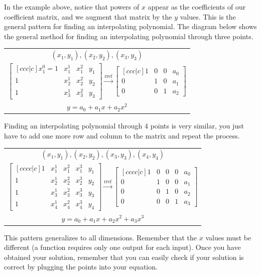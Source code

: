 In the example above, notice that powers of $x$ appear as the coefficients of our coefficient matrix, and we augment that matrix by the $y$ values. This is the general pattern for finding an interpolating polynomial. The diagram below shows the general method for finding an interpolating polynomial through three points.
\begin{center}
\begin{tabular}{c}
$(x_1,y_1),(x_2,y_2),(x_3,y_3)$ \\
 $
\begin{bmatrix}[ccc|c] 
x_1^0=1&x_1^1&x_1^2&y_1\\
1&x_2^1&x_2^2&y_2\\
1&x_3^1&x_3^2&y_3
\end {bmatrix}
\xrightarrow{\text{rref}}
\begin{bmatrix}[ccc|c]
1&0&0&a_0\\
0&1&0&a_1\\
0&0&1&a_2
\end {bmatrix} 
$
\\
 $y=a_0+a_1x+a_2x^2$
\end{tabular}
\end{center}
Finding an interpolating polynomial through 4 points is very similar, you just have to add one more row and column to the matrix and repeat the process.
\begin{center}
\begin{tabular}{c}
$(x_1,y_1),(x_2,y_2),(x_3,y_3),(x_4,y_4)$\\
$
\begin{bmatrix}[cccc|c] 
1&x_1^1&x_1^2&x_1^3&y_1\\
1&x_2^1&x_2^2&x_2^3&y_2\\
1&x_3^1&x_3^2&x_3^3&y_3\\
1&x_4^1&x_4^2&x_4^3&y_4
\end {bmatrix}
\xrightarrow{\text{rref}}
\begin{bmatrix}[cccc|c]
1&0&0&0&a_0\\
0&1&0&0&a_1\\
0&0&1&0&a_2\\
0&0&0&1&a_3
\end {bmatrix} 
$\\
$y=a_0+a_1x+a_2x^2+a_3x^3$
\end{tabular}
This pattern generalizes to all dimensions. Remember that the $x$ values must be different (a function requires only one output for each input). Once you have obtained your solution, remember that you can easily check if your solution is correct by plugging the points into your equation. 
\end{center}





















